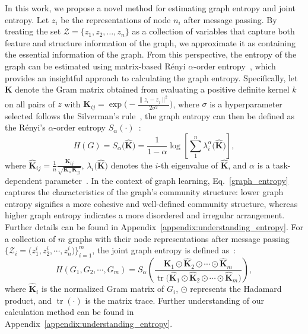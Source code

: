 In this work, we propose a novel method for estimating graph entropy and joint entropy.  Let $z_{i}$ be the representations of node $n_{i}$ after message passing. By treating the set $\mathcal{Z}=\{z_{1}, z_{2}, \dots, z_{n}\}$ as a collection of variables that capture both feature and structure information of the graph, we approximate it as containing the essential information of the graph. From this perspective, the entropy of the graph can be estimated using matrix-based R\'{e}nyi $\alpha$-order entropy~\cite{yu2019multivariate}, which provides an insightful approach to calculating the graph entropy. 
Specifically, let $\mathbf{K}$ denote the Gram matrix obtained from evaluating a positive definite kernel $k$ on all pairs of $z$ with $\mathbf{K}_{ij}=\exp\Big(-\frac{\|z_{i}-z_{j}\|^{2}}{2\sigma ^{2}}\Big)$, where $\sigma$ is a hyperparameter selected follows the Silverman’s rule~\cite{silverman2018density}, the graph entropy can then be defined as the R\'{e}nyi’s $\alpha$-order entropy $S_{\alpha}(\cdot)$~\cite{yu2019multivariate}:
\begingroup
\setlength{\abovedisplayskip}{0.8\abovedisplayskip}
\setlength{\belowdisplayskip}{0.8\belowdisplayskip}
\begin{equation}
\label{graph_entropy}
    H(G) 
    = S_\alpha\big(\hat{\mathbf{K}}\big)
    = \frac{1}{1-\alpha}\log\left[\sum_{1}^{n}\lambda_{i}^{\alpha}\big(\hat{\mathbf{K}}\big)\right],
\end{equation}
\endgroup
where $\hat{\mathbf{K}}_{ij}=\frac{1}{n}\frac{\mathbf{K}_{ij}}{\sqrt{\mathbf{K}_{ii}\mathbf{K}_{jj}}}$, $\lambda_{i}\big(\hat{\mathbf{K}}\big)$ denotes the $i$-th eigenvalue of $\hat{\mathbf{K}}$, and $\alpha$ is a task-dependent parameter~\cite{yu2019multivariate}. In the context of graph learning, Eq.~\eqref{graph_entropy} captures the characteristics of the graph's community structure: lower graph entropy signifies a more cohesive and well-defined community structure, whereas higher graph entropy indicates a more disordered and irregular arrangement. Further details can be found in Appendix~\ref{appendix:understanding_entropy}. For a collection of $m$ graphs with their node representations after message passing $\big\{\mathcal{Z}_{i}=\big(z_{1}^{i}, z_{2}^{i},\cdots, z_{n}^{i}\big)\big\}_{i=1}^{m}$, the joint graph entropy is defined as~\cite{yu2019multivariate}:
\begin{equation}
\label{graph_joint_entropy}
    H(G_{1}, G_{2}, \cdots, G_{m})=S_\alpha\left(\frac{\hat{\mathbf{K}}_{1}\odot \hat{\mathbf{K}}_{2} \odot \cdots \odot \hat{\mathbf{K}}_{m}}{\operatorname{tr}\big(\hat{\mathbf{K}}_{1}\odot \hat{\mathbf{K}}_{2}  \odot \cdots \odot \hat{\mathbf{K}}_{m}\big)}\right),
\end{equation}
where $\hat{\mathbf{K}}_{i}$ is the normalized Gram matrix of $G_{i}$, $\odot$ represents the Hadamard product, and $\operatorname{tr}(\cdot)$ is the matrix trace. 
Further understanding of our calculation method can be found in Appendix~\ref{appendix:understanding_entropy}.


